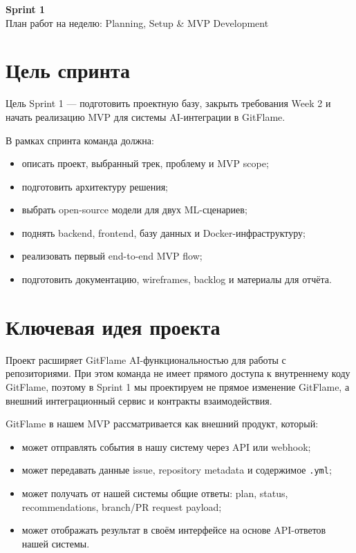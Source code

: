 \documentclass[12pt,a4paper]{article}
\begin{document}

\begin{center}
    {\LARGE \textbf{Sprint 1}}\\[6pt]
    {\large План работ на неделю: Planning, Setup \& MVP Development}
\end{center}

\section{Цель спринта}

Цель Sprint 1 --- подготовить проектную базу, закрыть требования Week 2 и начать реализацию MVP для системы AI-интеграции в GitFlame.

В рамках спринта команда должна:

\begin{itemize}
    \item описать проект, выбранный трек, проблему и MVP scope;
    \item подготовить архитектуру решения;
    \item выбрать open-source модели для двух ML-сценариев;
    \item поднять backend, frontend, базу данных и Docker-инфраструктуру;
    \item реализовать первый end-to-end MVP flow;
    \item подготовить документацию, wireframes, backlog и материалы для отчёта.
\end{itemize}

\section{Ключевая идея проекта}

Проект расширяет GitFlame AI-функциональностью для работы с репозиториями. При этом команда не имеет прямого доступа к внутреннему коду GitFlame, поэтому в Sprint 1 мы проектируем не прямое изменение GitFlame, а внешний интеграционный сервис и контракты взаимодействия.

GitFlame в нашем MVP рассматривается как внешний продукт, который:

\begin{itemize}
    \item может отправлять события в нашу систему через API или webhook;
    \item может передавать данные issue, repository metadata и содержимое \texttt{.yml};
    \item может получать от нашей системы общие ответы: plan, status, recommendations, branch/PR request payload;
    \item может отображать результат в своём интерфейсе на основе API-ответов нашей системы.
\end{itemize}
\end{document}
